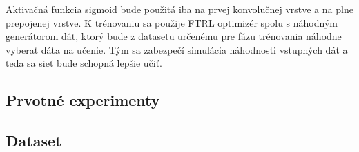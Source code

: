 Aktivačná funkcia sigmoid bude použitá iba na prvej konvolučnej vrstve a na plne prepojenej vrstve. K trénovaniu sa použije FTRL optimizér spolu s náhodným generátorom dát, ktorý bude z datasetu určenému pre fázu trénovania náhodne vyberať dáta na učenie. Tým sa zabezpečí simulácia náhodnosti vstupných dát a teda sa sieť bude schopná lepšie učiť. 
\fi 

\subsection{Prvotné experimenty}
\label{first_experiments}

\subsection{Dataset}
\label{dataset}


\iffalse
\begin{equation}
content...
\end{equation}
\fi